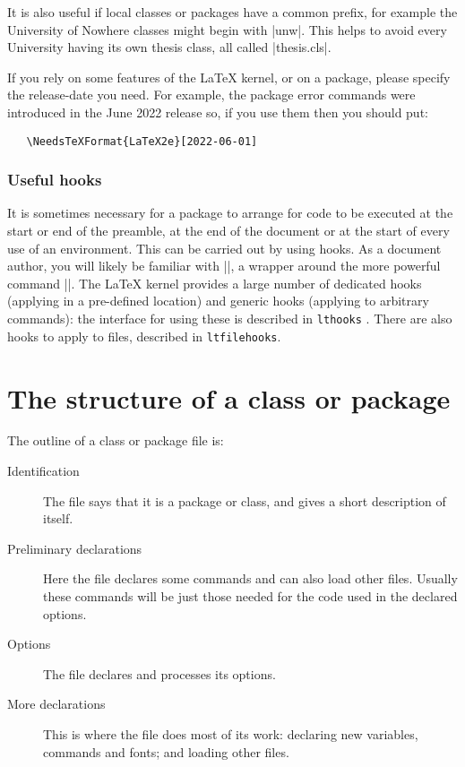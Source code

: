 \documentclass{ltxguide}
\begin{document}
It is also useful if local classes or packages have a common prefix, for
example the University of Nowhere classes might begin with |unw|. This helps to
avoid every University having its own thesis class, all called |thesis.cls|.

If you rely on some features of the \LaTeX{} kernel, or on a package,
please specify the release-date you need.  For example, the package
error commands were introduced in the June 2022 release so, if you use
them then you should put:
\begin{verbatim}
   \NeedsTeXFormat{LaTeX2e}[2022-06-01]
\end{verbatim}

\subsubsection{Useful hooks}

It is sometimes necessary for a package to arrange for code to be
executed at the start or end of the preamble, at the end of the document
or at the start of every use of an environment. This can be carried
out by using hooks. As a document author, you will likely be familiar with
|\AtBeginDocument|, a wrapper around the more powerful command |\AddToHook|.
The \LaTeX{} kernel provides a large number of dedicated hooks (applying in
a pre-defined location) and generic hooks (applying to arbitrary commands):
the interface for using these is described in \texttt{lthooks} . There are
also hooks to apply to files, described in \texttt{ltfilehooks}.

\section{The structure of a class or package}
\label{Sec:structure}

The outline of a class or package file is:
\begin{description}
\item[Identification] The file says that it is a \LaTeXe{} package or
   class, and gives a short description of itself.
\item[Preliminary declarations]
   Here the file declares some commands and can also load
   other files.  Usually these commands will be just those needed for
   the code used in the declared options.
\item[Options] The file declares and processes its options.
\item[More declarations] This is where the file does most of its work:
   declaring new variables, commands and fonts; and loading other files.
\end{description}
\end{document}
